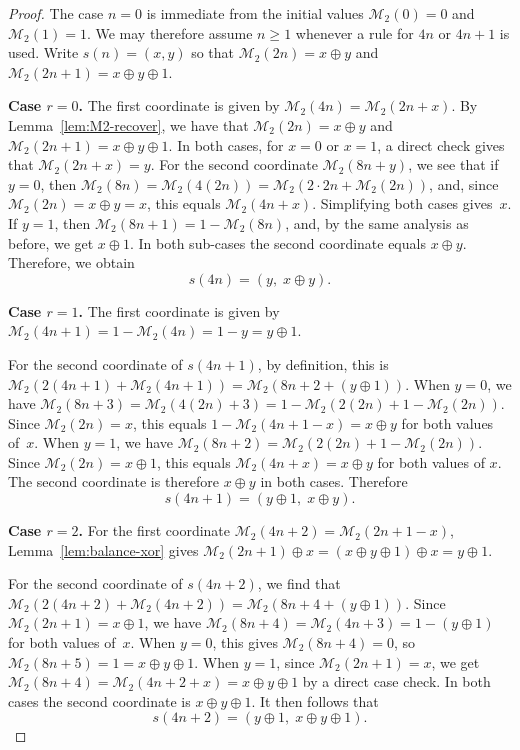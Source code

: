 \documentclass[12pt,reqno]{article}
\theoremstyle{plain}
\theoremstyle{definition}
\theoremstyle{remark}
\begin{document}
\begin{proof}
 The case $n=0$ is immediate from the initial values $\mathcal{M}_{2}(0)=0$
 and $\mathcal{M}_{2}(1)=1$. We may therefore assume $n\ge 1$ whenever a rule for $4n$ or
 $4n+1$ is used.
 Write $s(n) = (x,y)$ so that $\mathcal{M}_{2}(2n) = x \oplus y$ and $\mathcal{M}_{2}(2n+1) = x \oplus y \oplus 1$.

\textbf{Case $r = 0$.}
 The first coordinate is given by $\mathcal{M}_{2}(4n) = \mathcal{M}_{2}(2n + x)$. By Lemma~\ref{lem:M2-recover}, we have that
 $\mathcal{M}_{2}(2n) = x \oplus y$ and $\mathcal{M}_{2}(2n+1) = x \oplus y \oplus 1$. In both cases, for $x = 0$ or $x = 1$, a direct 
 check gives that $\mathcal{M}_{2}(2n + x) = y$. For the second coordinate $\mathcal{M}_{2}(8n + y)$, we see that if $y = 0$, then 
 $\mathcal{M}_{2}(8n) = \mathcal{M}_{2}(4(2n)) = \mathcal{M}_{2}(2 \cdot 2n + \mathcal{M}_{2}(2n))$, and, since $\mathcal{M}_{2}(2n) = x 
 \oplus y = x$, this equals $\mathcal{M}_{2}(4n + x)$. Simplifying both cases gives~$x$. If $y = 1$, then $\mathcal{M}_{2}(8n+1) = 1 
 - \mathcal{M}_{2}(8n)$, and, by the same analysis as before, we get $x \oplus 1$. In both sub-cases the second coordinate equals 
 $x \oplus y$. Therefore, we obtain 
$$ s(4n) = (y,\; x \oplus y). $$

\textbf{Case $r = 1$.} The first coordinate is given by $\mathcal{M}_{2}(4n+1) = 1 - \mathcal{M}_{2}(4n) = 1 - y = y \oplus 1$.

 For the second coordinate of $s(4n+1)$, by definition, this is $\mathcal{M}_{2}(2(4n+1) + \mathcal{M}_{2}(4n+1)) = 
 \mathcal{M}_{2}(8n + 2 + (y \oplus 1))$. When $y = 0$, we have $\mathcal{M}_{2}(8n+3) = \mathcal{M}_{2}(4(2n)+3) = 1 - 
 \mathcal{M}_{2}(2(2n)+1-\mathcal{M}_{2}(2n))$. Since $\mathcal{M}_{2}(2n) = x$, this equals $1 - \mathcal{M}_{2}(4 n + 1 - 
 x) = x \oplus y$ for both values of~$x$. When $y = 1$, we have $\mathcal{M}_{2}(8n+2) = \mathcal{M}_{2}(2(2n) + 1 - 
 \mathcal{M}_{2}(2n))$. Since $\mathcal{M}_{2}(2n) = x \oplus 1$, this equals $\mathcal{M}_{2}(4n+x) = x \oplus y$ for both values of 
 $x$. The second coordinate is therefore $x \oplus y$ in both cases. Therefore
\[
 s(4n+1) = (y \oplus 1,\; x \oplus y).
\]

\textbf{Case $r = 2$.} For the first coordinate $\mathcal{M}_{2}(4n+2) = \mathcal{M}_{2}(2n + 1 - x)$, Lemma~\ref{lem:balance-xor} gives $\mathcal{M}_{2}(2n+1) \oplus x = (x \oplus y \oplus 1) \oplus x = y \oplus 1$.

 For the second coordinate of $s(4n+2)$, we find that $\mathcal{M}_{2}(2(4n+2)+\mathcal{M}_{2}(4n+2)) = \mathcal{M}_{2}(8 n + 4 + 
 (y\oplus 1))$. Since $\mathcal{M}_{2}(2n+1) = x \oplus 1$, we have $\mathcal{M}_{2}(8 n + 4) = \mathcal{M}_{2}(4n+3) = 1-(y \oplus 
 1)$ for both values of~$x$. When $y=0$, this gives $\mathcal{M}_{2}(8n+4)=0$, so $\mathcal{M}_{2}(8n+5)=1=x\oplus y\oplus 1$.
When $y=1$, since $\mathcal{M}_{2}(2n+1)=x$, we get $\mathcal{M}_{2}(8n+4) = \mathcal{M}_{2}(4n+2+x)=x\oplus y\oplus 1$ by a 
 direct case check. In both cases the second coordinate is $x \oplus y \oplus 1$. It then follows that 
\[
 s(4n+2) = (y \oplus 1,\; x \oplus y \oplus 1).
\]


\end{proof}
\end{document}
